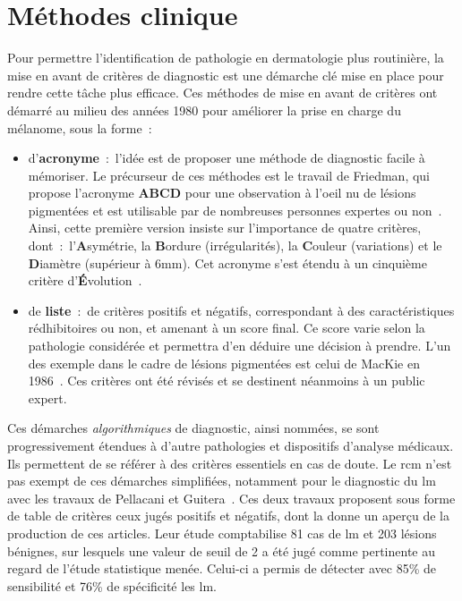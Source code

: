 \section{Méthodes clinique}
\label{sec:clinical_methods}
Pour permettre l'identification de pathologie en dermatologie plus routinière, la mise en avant de critères de diagnostic est une démarche clé mise en place pour rendre cette tâche plus efficace. Ces méthodes de mise en avant de critères ont démarré au milieu des années 1980 pour améliorer la prise en charge du mélanome, sous la forme~:
\begin{itemize}
    \item d'\textbf{acronyme}~:~l'idée est de proposer une méthode de diagnostic facile à mémoriser. Le précurseur de ces méthodes est le travail de Friedman, qui propose l'acronyme \textbf{ABCD} pour une observation à l'oeil nu de lésions pigmentées et est utilisable par de nombreuses personnes expertes ou non~\cite{Friedman1985}. Ainsi, cette première version insiste sur l'importance de quatre critères, dont~:~l'\textbf{A}symétrie, la \textbf{B}ordure (irrégularités), la \textbf{C}ouleur (variations) et le \textbf{D}iamètre (supérieur à 6mm). Cet acronyme s'est étendu à un cinquième critère d'\textbf{É}volution~\cite{Abbasi2004}.
    \item de \textbf{liste}~:~de critères positifs et négatifs, correspondant à des caractéristiques rédhibitoires ou non, et amenant à un score final. Ce score varie selon la pathologie considérée et permettra d'en déduire une décision à prendre. L'un des exemple dans le cadre de lésions pigmentées est celui de MacKie en 1986~\cite{mackie1986}. Ces critères ont été révisés et se destinent néanmoins à un public expert. 
\end{itemize}\par

Ces démarches \textit{algorithmiques} de diagnostic, ainsi nommées, se sont progressivement étendues à d'autre pathologies et dispositifs d'analyse médicaux. Ils permettent de se référer à des critères essentiels en cas de doute. Le \gls{rcm} n'est pas exempt de ces démarches simplifiées, notamment pour le diagnostic du \gls{lm} avec les travaux de Pellacani et Guitera~\cite{Pellacani2007, Guitera2010}. Ces deux travaux proposent sous forme de table de critères ceux jugés positifs et négatifs, dont la  donne un aperçu de la production de ces articles. Leur étude comptabilise 81 cas de \gls{lm} et 203 lésions bénignes, sur lesquels une valeur de seuil de 2 a été jugé comme pertinente au regard de l'étude statistique menée. Celui-ci a permis de détecter avec 85\% de sensibilité et 76\% de spécificité les \gls{lm}.\par

